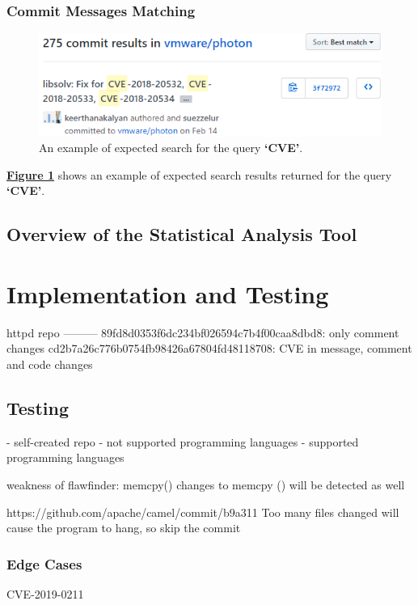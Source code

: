\documentclass[12pt, a4paper]{report}
\begin{document}
\subsection{Commit Messages Matching}
\begin{figure}[H]
  \centering
  \includegraphics[width=.85\linewidth]{images/keyword_search.png}
  \caption{An example of expected search for the query \textbf{`CVE'}.}
  \label{figure:keyword_search}
\end{figure}

\hyperref[figure:keyword_search]{\textbf{Figure \ref*{figure:keyword_search}}} shows an example of
expected search results returned for the query \textbf{`CVE'}.

\section{Overview of the Statistical Analysis Tool}

\chapter{Implementation and Testing}
httpd repo
---------
89fd8d0353f6dc234bf026594c7b4f00caa8dbd8: only comment changes
cd2b7a26c776b0754fb98426a67804fd48118708: CVE in message, comment and code changes

\section{Testing}
- self-created repo
- not supported programming languages
- supported programming languages

weakness of flawfinder:
memcpy() changes to memcpy () will be detected as well

https://github.com/apache/camel/commit/b9a311
Too many files changed will cause the program to hang, so skip the commit

\subsection{Edge Cases}
CVE-2019-0211
\end{document}
